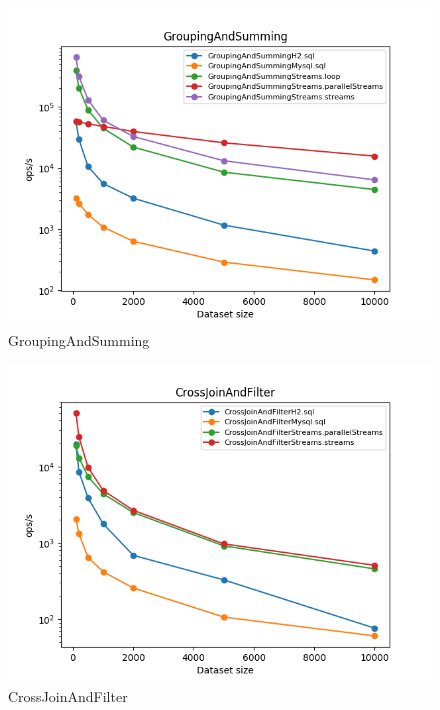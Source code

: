 \documentclass[12pt]{extarticle}
\begin{document}
\begin{figure}[H]
\centering
\includegraphics[width=13cm]{plots/GroupingAndSumming}
\caption{GroupingAndSumming}
\end{figure}

\begin{figure}[H]
\centering
\includegraphics[width=13cm]{plots/CrossJoinAndFilter}
\caption{CrossJoinAndFilter}
\end{figure}
\end{document}
